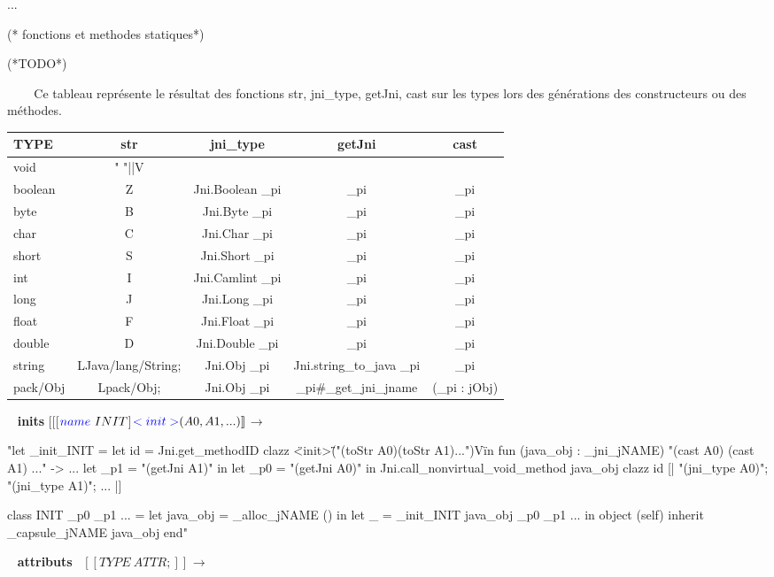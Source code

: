 \documentclass[a4paper, 11pt]{report}
\begin{document}
...
\begin{OCaml}
(* fonctions et  methodes statiques*)
 
    (*TODO*)

\end{OCaml}


\
\ 
\newline
\ 
\newline
Ce tableau représente le résultat des fonctions str, jni\_type, getJni, cast sur les types lors des générations des constructeurs ou des méthodes.

\noindent
\begin{tabular}{|l|c|c|c|c|}
  \hline
  TYPE & str & jni\_type & getJni & cast \\
  \hline
  void & " "||V & & & \\
  boolean & Z & Jni.Boolean \_pi & \_pi  & \_pi \\
  byte & B & Jni.Byte \_pi & \_pi & \_pi \\
  char & C & Jni.Char \_pi & \_pi & \_pi \\
  short & S & Jni.Short \_pi & \_pi & \_pi  \\
  int & I & Jni.Camlint \_pi & \_pi &  \_pi \\
  long & J & Jni.Long \_pi &\_pi  & \_pi \\
  float & F & Jni.Float \_pi & \_pi & \_pi \\
  double & D & Jni.Double \_pi & \_pi & \_pi \\
  string &LJava/lang/String;& Jni.Obj \_pi & Jni.string\_to\_java \_pi & \_pi \\
  pack/Obj& Lpack/Obj;& Jni.Obj \_pi & \_pi\#\_get\_jni\_jname & (\_pi : jObj) \\
  \hline
\end{tabular}
\ 
\newline
\noindent
\textbf{ inits }
\newline
\noindent
$[\![$[$ {\color{blue}name}\ INIT $]${\color{blue} <init>} (A0,
    A1, ...)]\!]_{}$$\longrightarrow$
% 

\begin{OCaml}
"let _init_INIT =
  let id = Jni.get_methodID clazz \"<init>\" 
            \"("(toStr A0)(toStr A1)...")V\"
  in
    fun (java_obj : _jni_jNAME) "(cast A0) (cast A1) ..." -> 
      ...
      let _p1 = "(getJni A1)" in
      let _p0 = "(getJni A0)" in
      Jni.call_nonvirtual_void_method java_obj clazz id 
          [| "(jni\_type A0)"; "(jni\_type A1)"; ... |]

class INIT _p0 _p1 ... =
  let java_obj = _alloc_jNAME ()
  in let _ = _init_INIT java_obj _p0 _p1 ...
    in object (self) inherit _capsule_jNAME java_obj 
end"

\end{OCaml}
\ 
\newline
\noindent
\textbf{ attributs }
\newline
\noindent
\ 
$[\![ TYPE\ ATTR; ]\!]_{}$$\longrightarrow$
\end{document}
